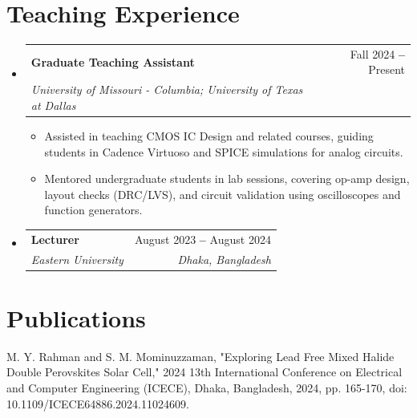 \documentclass[letterpaper,11pt]{article}
\makeatletter
\newcommand{\resumeItem}[1]{
  \item\small{
    {#1 \vspace{-3pt}}
  }
}
\newcommand{\resumeSubheading}[4]{
  \vspace{-3pt}\item
    \begin{tabular*}{0.97\textwidth}[t]{l@{\extracolsep{\fill}}r}
      \textbf{#1} & #2 \\
      \textit{\small#3} & \textit{\small #4} \\
    \end{tabular*}\vspace{-3pt}
}
\newcommand{\resumeSubHeadingListStart}{\begin{itemize}[leftmargin=0.15in, label={}]}
\newcommand{\resumeSubHeadingListEnd}{\end{itemize}}
\newcommand{\resumeItemListStart}{\begin{itemize}}
\newcommand{\resumeItemListEnd}{\end{itemize}\vspace{-3pt}}
\makeatother
\begin{document}
\section{Teaching Experience}
  \vspace{-3pt}
  \resumeSubHeadingListStart

    \resumeSubheading
      {Graduate Teaching Assistant}{Fall 2024 \textbf{--} Present} 
      {University of Missouri - Columbia; University of Texas at Dallas}{}
      \resumeItemListStart
        \resumeItem{Assisted in teaching CMOS IC Design and related courses, guiding students in Cadence Virtuoso and SPICE simulations for analog circuits.}
        \resumeItem{Mentored undergraduate students in lab sessions, covering op-amp design, layout checks (DRC/LVS), and circuit validation using oscilloscopes and function generators.}
      \resumeItemListEnd
    \vspace{-5pt}

    \resumeSubheading
      {Lecturer}{August 2023 \textbf{--} August 2024}
      {Eastern University}{Dhaka, Bangladesh}

    \vspace{-3pt}  

  \resumeSubHeadingListEnd




\section{Publications}
\vspace{-3pt}
M. Y. Rahman and S. M. Mominuzzaman, "Exploring Lead Free Mixed Halide Double Perovskites Solar Cell," 2024 13th International Conference on Electrical and Computer Engineering (ICECE), Dhaka, Bangladesh, 2024, pp. 165-170, doi: 10.1109/ICECE64886.2024.11024609.

    

\end{document}
